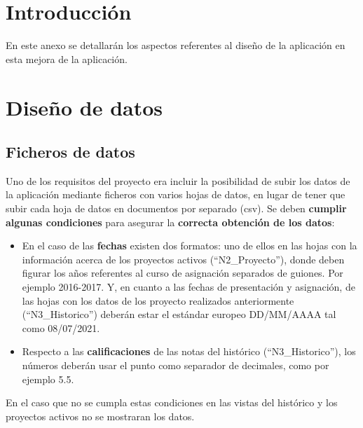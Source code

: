 
\section{Introducción}
En este anexo se detallarán los aspectos referentes al diseño de la aplicación en esta mejora de la aplicación.

\section{Diseño de datos}

\subsection{Ficheros de datos}

Uno de los requisitos del proyecto era incluir la posibilidad de subir los datos de la aplicación mediante ficheros con varios hojas de datos, en lugar de tener que subir cada hoja de datos en documentos por separado (csv). Se deben \textbf{cumplir algunas condiciones} para asegurar la \textbf{correcta obtención de los datos}:
\begin{itemize}
	\item En el caso de las \textbf{fechas} existen dos formatos: uno de ellos en las hojas con la información acerca de los proyectos activos (``N2\_Proyecto''), donde deben figurar los años referentes al curso de asignación separados de guiones. Por ejemplo 2016-2017. 	
	Y, en cuanto a las fechas de presentación y asignación, de las hojas con los datos de los proyecto realizados anteriormente (``N3\_Historico'') deberán estar el estándar europeo DD/MM/AAAA tal como 08/07/2021.	
	\item Respecto a las \textbf{calificaciones} de las notas del histórico (``N3\_Historico''), los números deberán usar el punto como separador de decimales, como por ejemplo 5.5.
\end{itemize}

En el caso que no se cumpla estas condiciones en las vistas del histórico y los proyectos activos no se mostraran los datos.


